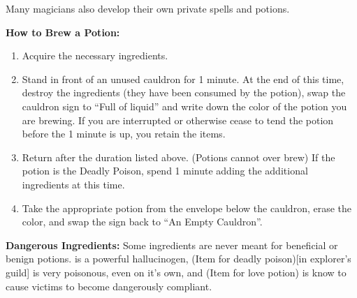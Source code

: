 \documentclass[green]{NeptuneBall}
\begin{document}
Many magicians also develop their own private spells and potions.

{\bf How to Brew a Potion:}\\ %
\begin{enumerate}
  \item Acquire the necessary ingredients.
  \item Stand in front of an unused cauldron for 1 minute. At the end of this time, destroy the ingredients (they have been consumed by the potion), swap the cauldron sign to ``Full of liquid'' and write down the color of the potion you are brewing. If you are interrupted or otherwise cease to tend the potion before the 1 minute is up, you retain the items.
  \item Return after the duration listed above. (Potions cannot over brew) If the potion is the Deadly Poison, spend 1 minute adding the additional ingredients at this time.
  \item Take the appropriate potion from the envelope below the cauldron, erase the color, and swap the sign back to ``An Empty Cauldron''.
\end{enumerate}

{\bf Dangerous Ingredients:}
Some ingredients are never meant for beneficial or benign potions. \iHemlock{} is a powerful hallucinogen, (Item for deadly poison)[in explorer's guild] is very poisonous, even on it's own, and (Item for love potion) is know to cause victims to become dangerously compliant.
\end{document}
